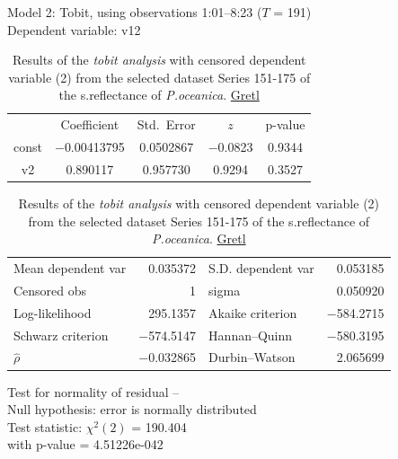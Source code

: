\documentclass[11pt]{article}
\begin{document}
\begin{appendices}
\begin{table}[H]
	\begin{center}
		\caption{Results of the \textit{tobit analysis} with censored dependent variable (2) from the selected dataset Series 151-175 of the s.reflectance of \textit{P.oceanica}. \href{http://gretl.sourceforge.net/}{Gretl}}
			Model 2: Tobit, using observations 1:01--8:23 ($T$ = 191)\\
			Dependent variable: v12\\
		\vspace{1em}
	\begin{tabular}{|c c c c c|}
		  &  {Coefficient} &    {Std.\ Error} & {$z$} & {p-value} \\[1ex]
		const &   $-$0.00413795 &     0.0502867 &     $-$0.0823 &         0.9344 \\
		v2 &   0.890117 &     0.957730 &       0.9294 &         0.3527 \\
	\end{tabular}

	\vspace{1ex}
	\begin{tabular}{lrlr}
		Mean dependent var &  0.035372 & S.D. dependent var &  0.053185 \\
		Censored obs &         1 & sigma &  0.050920 \\
		Log-likelihood &  295.1357 & Akaike criterion & $-$584.2715 \\
		Schwarz criterion & $-$574.5147 & Hannan--Quinn & $-$580.3195 \\
		$\hat{\rho}$ & $-$0.032865 & Durbin--Watson &  2.065699 \\
	\end{tabular}

	\vspace{1em}
	\begin{raggedright}
		Test for normality of residual --\\
		\quad Null hypothesis: error is normally distributed\\
		\quad Test statistic: $\chi^2(2)$ = 190.404\\
		\quad with p-value = 4.51226e-042\\
	\vspace{1ex}
	\end{raggedright}
	\label{tab:25}
	\end{center}
\end{table}


\end{appendices}
\end{document}
